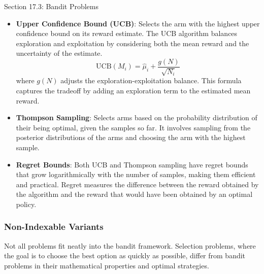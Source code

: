 \begin{notes}{Section 17.3: Bandit Problems}
\begin{highlight}
        \begin{itemize}
            \item \textbf{Upper Confidence Bound (UCB)}: Selects the arm with the highest upper confidence bound on its reward estimate. The UCB algorithm balances exploration and exploitation by 
            considering both the mean reward and the uncertainty of the estimate.
            \[
            \text{UCB}(M_i) = \hat{\mu}_i + \frac{g(N)}{\sqrt{N_i}}
            \]
            where \(g(N)\) adjusts the exploration-exploitation balance. This formula captures the tradeoff by adding an exploration term to the estimated mean reward.
            \item \textbf{Thompson Sampling}: Selects arms based on the probability distribution of their being optimal, given the samples so far. It involves sampling from the posterior distributions 
            of the arms and choosing the arm with the highest sample.
            \item \textbf{Regret Bounds}: Both UCB and Thompson sampling have regret bounds that grow logarithmically with the number of samples, making them efficient and practical. Regret measures 
            the difference between the reward obtained by the algorithm and the reward that would have been obtained by an optimal policy.
        \end{itemize}
    
    \end{highlight}
    
    \subsubsection*{Non-Indexable Variants}

    Not all problems fit neatly into the bandit framework. Selection problems, where the goal is to choose the best option as quickly as possible, differ from bandit problems in their mathematical 
    properties and optimal strategies.
    
    \begin{highlight}
    

\end{highlight}
\end{notes}
